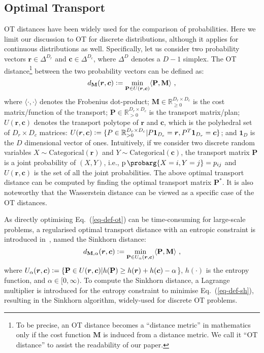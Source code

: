 \documentclass{article}
\renewcommand{\vec}{\boldsymbol}
\newcommand{\pprob}{\operatorname{p}\probarg}
\newcommand{\matr}[1]{\mathbf{#1}}
\newcommand{\eqdef}{\vcentcolon=}
\begin{document}
\subsection{Optimal Transport}
OT distances have been widely used for the comparison of probabilities. Here we limit our discussion to OT for discrete distributions, although it applies for continuous distributions as well.
Specifically, let us consider two probability vectors $\vec{r} \in \Delta^{D_r}$ and $\vec{c} \in \Delta^{D_c}$, where $\Delta^D$ denotes a $D-1$ simplex.
The OT distance\footnote{To be precise, an OT distance becomes a ``distance metric'' in mathematics only if the cost function $\matr{M}$ is induced from a distance metric. We call it ``OT distance'' to assist the readability of our paper.} between the two probability vectors can be defined as:
\vspace{0.01cm}
\begin{equation}
\label{eq-def-ot}
d_{\matr{M}}(\vec{r}, \vec{c}) \eqdef \min_{\matr{P} \in U(\vec{r}, \vec{c})} \langle \matr{P} , \matr{M} \rangle~,
\end{equation}
where $\langle\cdot,\cdot\rangle$ denotes the Frobenius dot-product;
$\matr{M} \in \mathbb{R}_{\ge 0}^{D_r \times D_c}$ is the cost matrix/function of the transport;
$\matr{P} \in \mathbb{R}_{>0}^{D_r \times D_c}$ is the transport matrix/plan;
$U(\vec{r}, \vec{c})$ denotes the transport polytope of $\vec{r}$ and $\vec{c}$, which is the polyhedral set of $D_r \times D_c$ matrices:
$U(\vec{r}, \vec{c}) \eqdef \{P \in \mathbb{R}^{D_r \times D_c}_{>0} | P \boldsymbol{1}_{D_c} = \vec{r}, P^T \boldsymbol{1}_{D_r} = \vec{c}\}$;
and $\boldsymbol{1}_{D}$ is the $D$ dimensional vector of ones.
Intuitively, if we consider two discrete random variables $X \sim \text{Categorical}(\vec{r})$ and $Y \sim \text{Categorical}(\vec{c})$, the transport matrix $\matr{P}$ is a joint probability of $(X, Y)$, i.e., $\pprob{X=i, Y=j} = p_{ij}$ and $U(\vec{r}, \vec{c})$ is the set of all the joint probabilities. The above optimal transport distance can be computed by finding the optimal transport matrix $\matr{P}^*$.
It is also noteworthy that the Wasserstein distance can be viewed as a specific case of the OT distances.

As directly optimising Eq.~(\ref{eq-def-ot}) can be time-consuming for large-scale problems, a regularised optimal transport distance with an entropic constraint is introduced in~\cite{cuturi2013sinkhorn}, named the Sinkhorn distance:
\begin{equation}
\label{eq-def-sh}
d_{\matr{M},\alpha}(\vec{r}, \vec{c}) \eqdef \min_{\matr{P} \in U_{\alpha}(\vec{r}, \vec{c})} \langle \matr{P} , \matr{M} \rangle~,
\end{equation}
where $U_{\alpha}(\vec{r}, \vec{c}) \eqdef \{\matr{P} \in U(\vec{r}, \vec{c}) | h(\matr{P}) \ge h(\vec{r}) + h(\vec{c}) -\alpha$\}, $h(\cdot)$ is the entropy function, 
and $\alpha \in [0, \infty)$.
To compute the Sinkhorn distance, a Lagrange multiplier is introduced for the entropy constraint to minimise Eq.~(\ref{eq-def-sh}), resulting in the Sinkhorn algorithm, widely-used for discrete OT problems.
\end{document}
